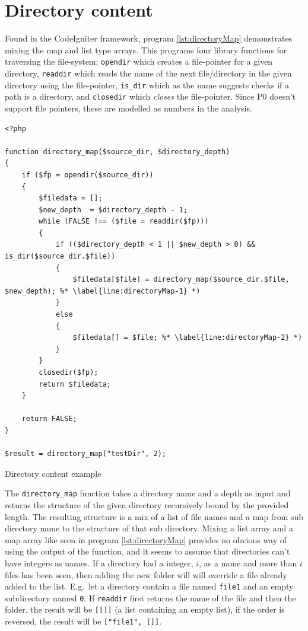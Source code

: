 \section{Directory content}
\label{sec:directoryContent}
Found in the CodeIgniter framework, program \ref{lst:directoryMap} demonstrates mixing the map and list type arrays. This programs four library functions for traversing the file-system; \texttt{opendir} which creates a file-pointer for a given directory, \texttt{readdir} which reads the name of the next file/directory in the given directory using the file-pointer, \texttt{is\_dir} which as the name suggests checks if a path is a directory, and \texttt{closedir} which \emph{closes} the file-pointer. Since P0 doesn't support file pointers, these are modelled as numbers in the analysis. 


\begin{program}
\begin{lstlisting}
<?php

function directory_map($source_dir, $directory_depth)
{
    if ($fp = opendir($source_dir))
    {
        $filedata = [];
        $new_depth	= $directory_depth - 1;
        while (FALSE !== ($file = readdir($fp)))
        {
            if (($directory_depth < 1 || $new_depth > 0) && is_dir($source_dir.$file))
            {
                $filedata[$file] = directory_map($source_dir.$file, $new_depth); %* \label{line:directoryMap-1} *)
            }
            else
            {
                $filedata[] = $file; %* \label{line:directoryMap-2} *)
            }
        }
        closedir($fp);
        return $filedata;
    }

    return FALSE;
}

$result = directory_map("testDir", 2);
\end{lstlisting}
\caption{Directory content example}
\label{lst:directoryMap}
\end{program}


The \texttt{directory\_map} function takes a directory name and a depth as input and returns the structure of the given directory recursively bound by the provided length. The resulting structure is a mix of a list of file names and a map from sub directory name to the structure of that sub directory. Mixing a list array and a map array like seen in program \ref{lst:directoryMap} provides no obvious way of using the output of the function, and it seems to assume that directories can't have integers as names. If a directory had a integer, $i$, as a name and more than $i$ files has been seen, then adding the new folder will will override a file already added to the list. E.g.\ let a directory contain a file named \texttt{file1} and an empty subdirectory named \texttt{0}. If \texttt{readdir} first returns the name of the file and then the folder, the result will be \texttt{[[]]} (a list containing an empty list), if the order is reversed, the result will be \texttt{["file1", []]}.

